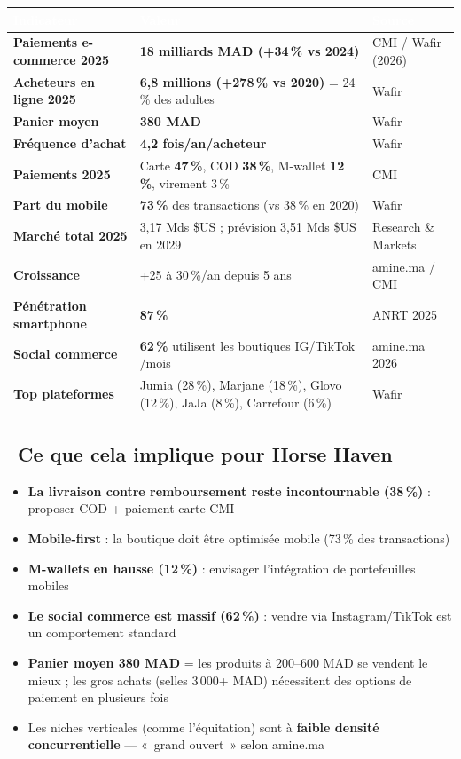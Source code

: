 \documentclass[11pt,a4paper]{article}
\newcommand{\thead}[1]{\textcolor{white}{\textbf{#1}}}
\begin{document}
{\small
\noindent
\begin{tabular}{L{5.2cm} L{6.6cm} L{3.7cm}}
\toprule
{}
\thead{Indicateur} & \thead{Valeur} & \thead{Source}\\
\midrule
\textbf{Paiements e-commerce 2025} & \textbf{18 milliards MAD (+34\,\% vs 2024)} & CMI / Wafir (2026)\\
\textbf{Acheteurs en ligne 2025} & \textbf{6,8 millions (+278\,\% vs 2020)} = 24\,\% des adultes & Wafir\\
\textbf{Panier moyen} & \textbf{380 MAD} & Wafir\\
\textbf{Fréquence d'achat} & \textbf{4,2 fois/an/acheteur} & Wafir\\
\textbf{Paiements 2025} & Carte \textbf{47\,\%}, COD \textbf{38\,\%}, M-wallet \textbf{12\,\%}, virement 3\,\% & CMI\\
\textbf{Part du mobile} & \textbf{73\,\%} des transactions (vs 38\,\% en 2020) & Wafir\\
\textbf{Marché total 2025} & 3,17 Mds \$US ; prévision 3,51 Mds \$US en 2029 & Research \& Markets\\
\textbf{Croissance} & +25 à 30\,\%/an depuis 5 ans & amine.ma / CMI\\
\textbf{Pénétration smartphone} & \textbf{87\,\%} & ANRT 2025\\
\textbf{Social commerce} & \textbf{62\,\%} utilisent les boutiques IG/TikTok /mois & amine.ma 2026\\
\textbf{Top plateformes} & Jumia (28\,\%), Marjane (18\,\%), Glovo (12\,\%), JaJa (8\,\%), Carrefour (6\,\%) & Wafir\\
\bottomrule
\end{tabular}}

\subsection{\faShoppingCart\ Ce que cela implique pour Horse Haven}
\begin{itemize}
  \item \textbf{La livraison contre remboursement reste incontournable (38\,\%)} : proposer COD + paiement carte CMI
  \item \textbf{Mobile-first} : la boutique doit être optimisée mobile (73\,\% des transactions)
  \item \textbf{M-wallets en hausse (12\,\%)} : envisager l'intégration de portefeuilles mobiles
  \item \textbf{Le social commerce est massif (62\,\%)} : vendre via Instagram/TikTok est un comportement standard
  \item \textbf{Panier moyen 380 MAD} = les produits à 200--600 MAD se vendent le mieux ; les gros achats (selles 3\,000+ MAD) nécessitent des options de paiement en plusieurs fois
  \item Les niches verticales (comme l'équitation) sont à \textbf{faible densité concurrentielle} --- «~grand ouvert~» selon amine.ma
\end{itemize}
\end{document}

